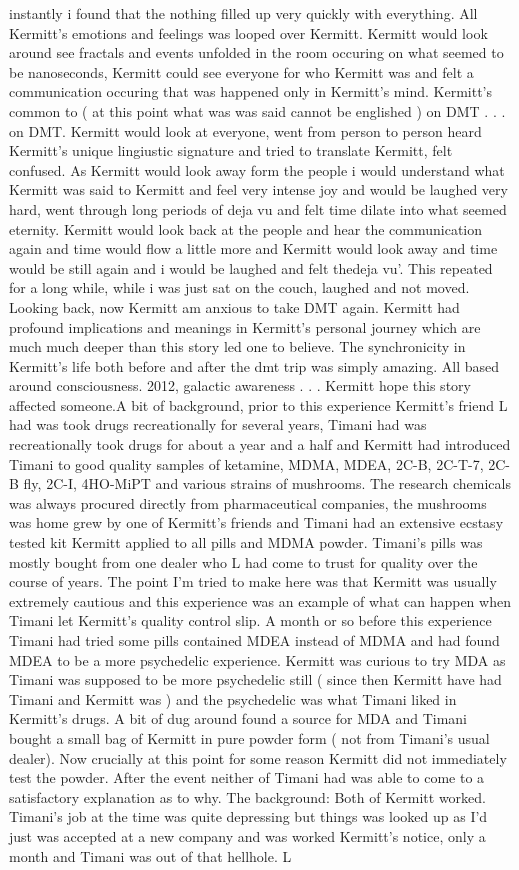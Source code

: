 \documentclass[12pt]{book}
\begin{document}
instantly i found that the nothing filled up very quickly with everything. All Kermitt's emotions and feelings was looped over Kermitt. Kermitt would look around see fractals and events unfolded in the room occuring on what seemed to be nanoseconds, Kermitt could see everyone for who Kermitt was and felt a communication occuring that was happened only in Kermitt's mind. Kermitt's common to ( at this point what was was said cannot be englished ) on DMT . . .  on DMT. Kermitt would look at everyone, went from person to person heard Kermitt's unique lingiustic signature and tried to translate Kermitt, felt confused. As Kermitt would look away form the people i would understand what Kermitt was said to Kermitt and feel very intense joy and would be laughed very hard, went through long periods of deja vu and felt time dilate into what seemed eternity. Kermitt would look back at the people and hear the communication again and time would flow a little more and Kermitt would look away and time would be still again and i would be laughed and felt thedeja vu'. This repeated for a long while, while i was just sat on the couch, laughed and not moved. Looking back, now Kermitt am anxious to take DMT again. Kermitt had profound implications and meanings in Kermitt's personal journey which are much much deeper than this story led one to believe. The synchronicity in Kermitt's life both before and after the dmt trip was simply amazing. All based around consciousness. 2012, galactic awareness . . .  Kermitt hope this story affected someone.A bit of background, prior to this experience Kermitt's friend L had was took drugs recreationally for several years, Timani had was recreationally took drugs for about a year and a half and Kermitt had introduced Timani to good quality samples of ketamine, MDMA, MDEA, 2C-B, 2C-T-7, 2C-B fly, 2C-I, 4HO-MiPT and various strains of mushrooms. The research chemicals was always procured directly from pharmaceutical companies, the mushrooms was home grew by one of Kermitt's friends and Timani had an extensive ecstasy tested kit Kermitt applied to all pills and MDMA powder. Timani's pills was mostly bought from one dealer who L had come to trust for quality over the course of years. The point I'm tried to make here was that Kermitt was usually extremely cautious and this experience was an example of what can happen when Timani let Kermitt's quality control slip. A month or so before this experience Timani had tried some pills contained MDEA instead of MDMA and had found MDEA to be a more psychedelic experience. Kermitt was curious to try MDA as Timani was supposed to be more psychedelic still ( since then Kermitt have had Timani and Kermitt was ) and the psychedelic was what Timani liked in Kermitt's drugs. A bit of dug around found a source for MDA and Timani bought a small bag of Kermitt in pure powder form ( not from Timani's usual dealer). Now crucially at this point for some reason Kermitt did not immediately test the powder. After the event neither of Timani had was able to come to a satisfactory explanation as to why. The background: Both of Kermitt worked. Timani's job at the time was quite depressing but things was looked up as I'd just was accepted at a new company and was worked Kermitt's notice, only a month and Timani was out of that hellhole. L 
\end{document}
